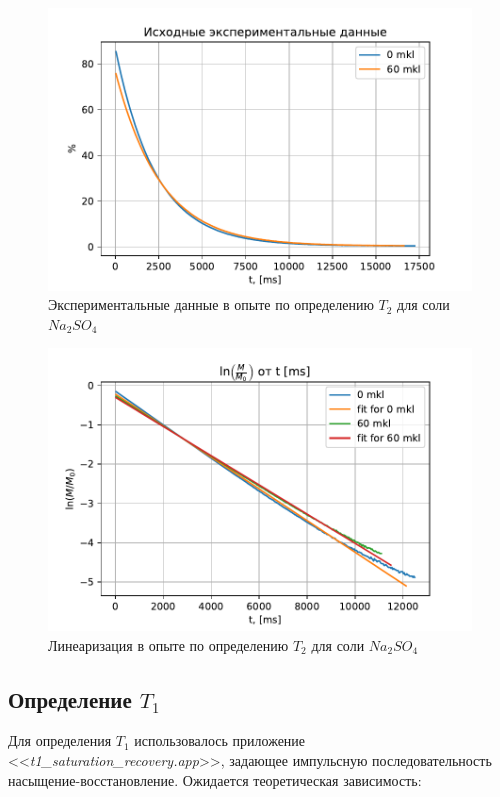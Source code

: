 \begin{figure}[h]
	\hspace{-1em}
	\includegraphics[width=1.0\linewidth]{data/Na_T_2_exper}
	\caption{Экспериментальные данные в опыте по определению $ T_2 $ для соли $ Na_2 SO_4 $}
	\label{fig:nat2exper}
\end{figure}
\begin{figure}[H]
	\hspace{-1em}
	\includegraphics[width=1.0\linewidth]{data/Na_T_2_reg}
	\caption{Линеаризация в опыте по определению $ T_2 $ для соли $ Na_2 SO_4 $}
	\label{fig:nat2reg}
\end{figure}

\subsection{Определение $ T_1 $}
Для определения $ T_1 $ использовалось приложение <<\textit{t1\_saturation\_recovery.app}>>, задающее импульсную последовательность насыщение-восстановление. Ожидается теоретическая зависимость:

